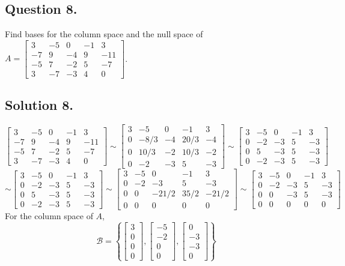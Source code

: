 \documentclass{article}
\begin{document}
\subsection*{Question 8.}
Find bases for the column space and the null space of $A=\left[\begin{array}{rrrrr}3&-5&0&-1&3\\-7&9&-4&9&-11\\-5&7&-2&5&-7\\3&-7&-3&4&0\end{array}\right]$.
\subsection*{Solution 8.}
\[\left[\begin{array}{rrrrr}3&-5&0&-1&3\\-7&9&-4&9&-11\\-5&7&-2&5&-7\\3&-7&-3&4&0\end{array}\right]\sim\left[\begin{array}{rrrrr}3&-5&0&-1&3\\0&-8/3&-4&20/3&-4\\0&10/3&-2&10/3&-2\\0&-2&-3&5&-3\end{array}\right]\sim\left[\begin{array}{rrrrr}3&-5&0&-1&3\\0&-2&-3&5&-3\\0&5&-3&5&-3\\0&-2&-3&5&-3\end{array}\right]\]
\[\sim\left[\begin{array}{rrrrr}3&-5&0&-1&3\\0&-2&-3&5&-3\\0&5&-3&5&-3\\0&-2&-3&5&-3\end{array}\right]\sim\left[\begin{array}{rrrrr}3&-5&0&-1&3\\0&-2&-3&5&-3\\0&0&-21/2&35/2&-21/2\\0&0&0&0&0\end{array}\right]\sim\left[\begin{array}{rrrrr}3&-5&0&-1&3\\0&-2&-3&5&-3\\0&0&-3&5&-3\\0&0&0&0&0\end{array}\right]\]
For the column space of $A$,
\[\mathcal{B}=\left\{\left[\begin{array}{r}3\\0\\0\\0\end{array}\right],\left[\begin{array}{r}-5\\-2\\0\\0\end{array}\right],\left[\begin{array}{r}0\\-3\\-3\\0\end{array}\right]\right\}\]
\end{document}
